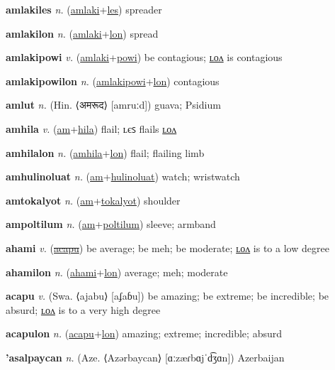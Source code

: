 \textbf{\hypertarget{amlakiles}{amlakiles}} \textit{n.} (\hyperlink{amlaki}{amlaki}+\allowbreak \hyperlink{les}{les})
spreader

\textbf{\hypertarget{amlakilon}{amlakilon}} \textit{n.} (\hyperlink{amlaki}{amlaki}+\allowbreak \hyperlink{lon}{lon})
spread

\textbf{\hypertarget{amlakipowi}{amlakipowi}} \textit{v.} (\hyperlink{amlaki}{amlaki}+\allowbreak \hyperlink{powi}{powi})
be contagious; \hyperlink{amlakipowilon}{ʟᴏᴧ} is contagious

\textbf{\hypertarget{amlakipowilon}{amlakipowilon}} \textit{n.} (\hyperlink{amlakipowi}{amlakipowi}+\allowbreak \hyperlink{lon}{lon})
contagious

\textbf{\hypertarget{amlut}{amlut}} \textit{n.} (Hin. ⟨{\devanagari{}अमरूद}⟩ [amruːd])
guava; Psidium

\textbf{\hypertarget{amhila}{amhila}} \textit{v.} (\hyperlink{am}{am}+\allowbreak \hyperlink{hila}{hila})
flail; ʟєꜱ flails \hyperlink{amhilalon}{ʟᴏᴧ}

\textbf{\hypertarget{amhilalon}{amhilalon}} \textit{n.} (\hyperlink{amhila}{amhila}+\allowbreak \hyperlink{lon}{lon})
flail; flailing limb

\textbf{\hypertarget{amhulinoluat}{amhulinoluat}} \textit{n.} (\hyperlink{am}{am}+\allowbreak \hyperlink{hulinoluat}{hulinoluat})
watch; wristwatch

\textbf{\hypertarget{amtokalyot}{amtokalyot}} \textit{n.} (\hyperlink{am}{am}+\allowbreak \hyperlink{tokalyot}{tokalyot})
shoulder

\textbf{\hypertarget{ampoltilum}{ampoltilum}} \textit{n.} (\hyperlink{am}{am}+\allowbreak \hyperlink{poltilum}{poltilum})
sleeve; armband

\textbf{\hypertarget{ahami}{ahami}} \textit{v.} (\hyperlink{acapu}{\sout{acapu}})
be average; be meh; be moderate; \hyperlink{ahamilon}{ʟᴏᴧ} is to a low degree

\textbf{\hypertarget{ahamilon}{ahamilon}} \textit{n.} (\hyperlink{ahami}{ahami}+\allowbreak \hyperlink{lon}{lon})
average; meh; moderate

\textbf{\hypertarget{acapu}{acapu}} \textit{v.} (Swa. ⟨ajabu⟩ [aʄaɓu])
be amazing; be extreme; be incredible; be absurd; \hyperlink{acapulon}{ʟᴏᴧ} is to a very high degree

\textbf{\hypertarget{acapulon}{acapulon}} \textit{n.} (\hyperlink{acapu}{acapu}+\allowbreak \hyperlink{lon}{lon})
amazing; extreme; incredible; absurd

\textbf{\hypertarget{'asalpaycan}{'asalpaycan}} \textit{n.} (Aze. ⟨Azərbaycan⟩ [ɑːzæɾbɑjˈd͡ʒɑn])
Azerbaijan

